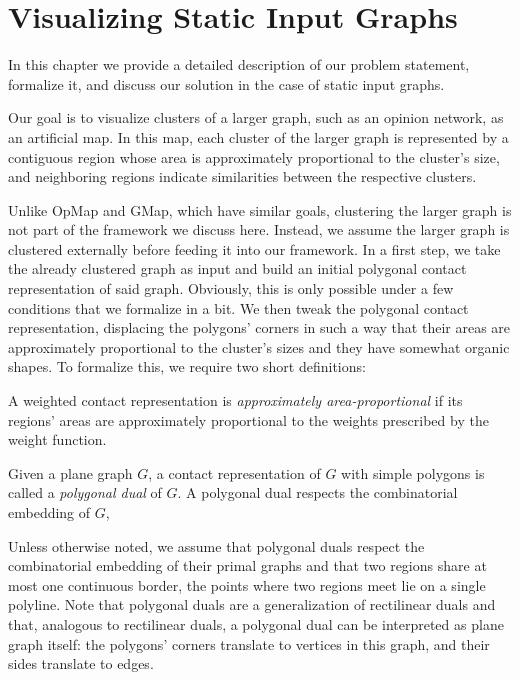 \chapter{Visualizing Static Input Graphs}
\label{chap:visualizing-static-input-graphs}

In this chapter we provide a detailed description of our problem statement, formalize it, and discuss our solution in the case of static input graphs.

Our goal is to visualize clusters of a larger graph, such as an opinion network, as an artificial map. In this map, each cluster of the larger graph is represented by a contiguous region whose area is approximately proportional to the cluster's size, and neighboring regions indicate similarities between the respective clusters.

Unlike OpMap and GMap, which have similar goals, clustering the larger graph is not part of the framework we discuss here. Instead, we assume the larger graph is clustered externally before feeding it into our framework. In a first step, we take the already clustered graph as input and build an initial polygonal contact representation of said graph. Obviously, this is only possible under a few conditions that we formalize in a bit. We then tweak the polygonal contact representation, displacing the polygons' corners in such a way that their areas are approximately proportional to the cluster's sizes and they have somewhat organic shapes. To formalize this, we require two short definitions:

\begin{definition}
	A weighted contact representation is \emph{approximately area-proportional} if its regions' areas are approximately proportional to the weights prescribed by the weight function.
\end{definition}

\begin{definition}
	Given a plane graph $G$, a contact representation of $G$ with simple polygons is called a \emph{polygonal dual} of $G$. A polygonal dual respects the combinatorial embedding of $G$, \ie{}
\end{definition}

Unless otherwise noted, we assume that polygonal duals respect the combinatorial embedding of their primal graphs and that two regions share at most one continuous border, \ie{} the points where two regions meet lie on a single polyline. Note that polygonal duals are a generalization of rectilinear duals and that, analogous to rectilinear duals, a polygonal dual can be interpreted as plane graph itself: the polygons' corners translate to vertices in this graph, and their sides translate to edges.


